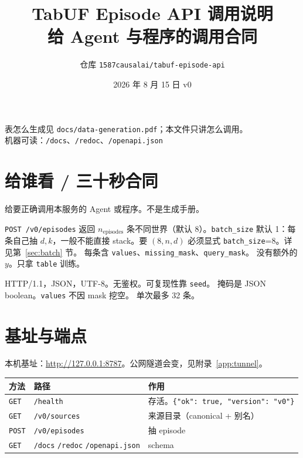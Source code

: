 \documentclass[11pt,a4paper,fontset=none]{ctexart}
\title{TabUF Episode API 调用说明\\[0.3em]
\large 给 Agent 与程序的调用合同}
\author{仓库 \texttt{1587causalai/tabuf-episode-api}}
\date{2026 年 8 月 15 日 \quad v0}
\begin{document}
\maketitle
\vspace{-1.0em}
\begin{center}
{\small 表怎么生成见 \texttt{docs/data-generation.pdf}；本文件只讲怎么调用。}\\[0.2em]
{\small 机器可读：\texttt{/docs}、\texttt{/redoc}、\texttt{/openapi.json}}
\end{center}

\section{给谁看 / 三十秒合同}

给要正确调用本服务的 Agent 或程序。不是生成手册。

\texttt{POST /v0/episodes} 返回 $n_{\mathrm{episodes}}$ 条不同世界（默认 8）。\texttt{batch\_size} 默认 1：每条自己抽 $d,k$，一般不能直接 stack。要 $(8,n,d)$ 必须显式 \texttt{batch\_size}=8。详见第~\ref{sec:batch} 节。
每条含 \texttt{values}、\texttt{missing\_mask}、\texttt{query\_mask}。
没有额外的 $y$。只拿 \texttt{table} 训练。

HTTP/1.1，JSON，UTF-8。无鉴权。可复现性靠 \texttt{seed}。
掩码是 JSON boolean。\texttt{values} 不因 mask 挖空。
单次最多 32 条。

\section{基址与端点}

本机基址：\url{http://127.0.0.1:8787}。公网隧道会变，见附录~\ref{app:tunnel}。

\begin{center}
\begin{tabular}{@{}lll@{}}
\toprule
方法 & 路径 & 作用 \\
\midrule
\texttt{GET}  & \texttt{/health} & 存活。\texttt{\{"ok": true, "version": "v0"\}} \\
\texttt{GET}  & \texttt{/v0/sources} & 来源目录（canonical + 别名） \\
\texttt{POST} & \texttt{/v0/episodes} & 抽 episode \\
\texttt{GET}  & \texttt{/docs} \quad \texttt{/redoc} \quad \texttt{/openapi.json} & schema \\
\bottomrule
\end{tabular}
\end{center}
\end{document}
